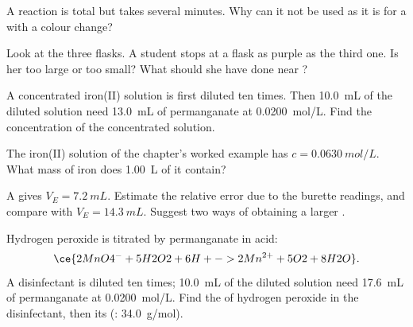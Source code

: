 \begin{exercise}[$\star\star$]\label{exo:g11:titration:8}
A reaction is total but takes several minutes. Why can it not be used as
it is for a  with a colour change?
\end{exercise}

\begin{exercise}[$\star\star$]\label{exo:g11:titration:9}
Look at the three flasks. A student stops at a flask as purple as the
third one. Is her  too large or too small? What should
she have done near ?
\end{exercise}

\begin{exercise}[$\star\star$]\label{exo:g11:titration:10}
A concentrated iron(II) solution is first diluted ten times. Then
\qty{10.0}{mL} of the diluted solution need \qty{13.0}{mL} of
permanganate at \qty{0.0200}{mol/L}. Find the concentration of the
concentrated solution.
\end{exercise}

\begin{exercise}[$\star\star$]\label{exo:g11:titration:11}
The iron(II) solution of the chapter's worked example has
$c = \qty{0.0630}{mol/L}$. What mass of iron does \qty{1.00}{L} of it
contain?
\end{exercise}

\begin{exercise}[$\star\star\star$]\label{exo:g11:titration:12}
A  gives $V_E = \qty{7.2}{mL}$. Estimate the relative error due
to the burette readings, and compare with $V_E = \qty{14.3}{mL}$. Suggest
two ways of obtaining a larger .
\end{exercise}

\begin{exercise}[$\star\star\star$]\label{exo:g11:titration:13}
Hydrogen peroxide is titrated by permanganate in acid:
\[
  \ce{2MnO4^- + 5H2O2 + 6H+ -> 2Mn^{2+} + 5O2 + 8H2O} .
\]
A disinfectant is diluted ten times; \qty{10.0}{mL} of the diluted
solution need \qty{17.6}{mL} of permanganate at \qty{0.0200}{mol/L}.
Find the  of hydrogen peroxide in the disinfectant,
then its  (: \qty{34.0}{g/mol}).
\end{exercise}

